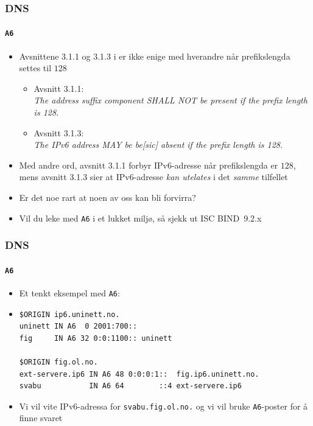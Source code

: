\begin{frame}%
  \frametitle{DNS}
  \framesubtitle{\texttt{A6}}
  \begin{itemize}%
  \item Avsnittene 3.1.1 og 3.1.3 i  er ikke enige med
    hverandre når prefikslengda settes til \(128\)
    \begin{itemize}%
    \item Avsnitt 3.1.1:\\
      \textit{The address suffix component SHALL NOT be present if the prefix
      length is 128.\/}
  \item Avsnitt 3.1.3:\\
    \textit{The IPv6 address MAY be be\textnormal{[sic]} absent if the
      prefix length is 128.\/}
    \end{itemize}
  \item Med andre ord, avsnitt 3.1.1 forbyr IPv6-adresse når
    prefikslengda er \(128\), mens avsnitt 3.1.3 sier at IPv6-adresse
    \textit{kan utelates\/} i det \textit{samme\/} tilfellet
  \item Er det noe rart at noen av oss kan bli forvirra?
  \item Vil du leke med \texttt{A6} i et lukket miljø, så sjekk ut
    ISC BIND~9.2.x
  \end{itemize}
\end{frame}

\begin{frame}[fragile]%
  \frametitle{DNS}
  \framesubtitle{\texttt{A6}}
  \begin{itemize}%
  \item Et tenkt eksempel med \texttt{A6}:
  \item 
\begin{verbatim}
$ORIGIN ip6.uninett.no.
uninett IN A6  0 2001:700::
fig     IN A6 32 0:0:1100:: uninett

$ORIGIN fig.ol.no.
ext-servere.ip6 IN A6 48 0:0:0:1::  fig.ip6.uninett.no.
svabu           IN A6 64        ::4 ext-servere.ip6
\end{verbatim}
  \item Vi vil vite IPv6-adressa for \texttt{svabu.fig.ol.no.} og vi
    vil bruke \texttt{A6}-poster for å finne svaret
  \end{itemize}
\end{frame}

